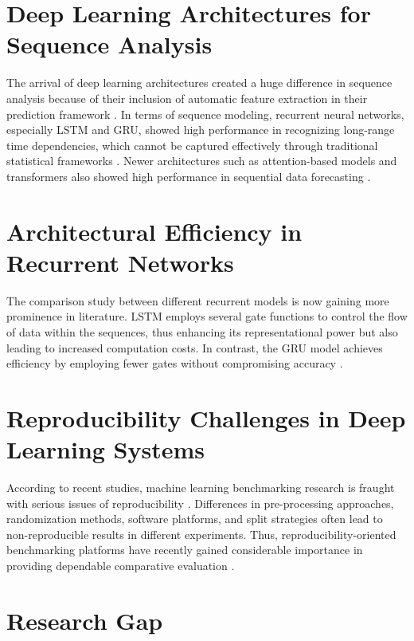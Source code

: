 \documentclass[12pt]{report}
\begin{document}
\section{Deep Learning Architectures for Sequence Analysis}

The arrival of deep learning architectures created a huge difference in sequence analysis because of their inclusion of automatic feature extraction in their prediction framework \cite{goodfellow2016, lecun2015}. In terms of sequence modeling, recurrent neural networks, especially LSTM and GRU, showed high performance in recognizing long-range time dependencies, which cannot be captured effectively through traditional statistical frameworks \cite{kong2017, marino2016}. Newer architectures such as attention-based models and transformers also showed high performance in sequential data forecasting \cite{wen2022, vaswani2017}.


\section{Architectural Efficiency in Recurrent Networks}

The comparison study between different recurrent models is now gaining more prominence in literature. LSTM employs several gate functions to control the flow of data within the sequences, thus enhancing its representational power but also leading to increased computation costs. In contrast, the GRU model achieves efficiency by employing fewer gates without compromising accuracy \cite{cho2014}.



\section{Reproducibility Challenges in Deep Learning Systems}

According to recent studies, machine learning benchmarking research is fraught with serious issues of reproducibility \cite{ullah2024}. Differences in pre-processing approaches, randomization methods, software platforms, and split strategies often lead to non-reproducible results in different experiments. Thus, reproducibility-oriented benchmarking platforms have recently gained considerable importance in providing dependable comparative evaluation \cite{lim2021, smyl2020}.


\section{Research Gap}
\end{document}
